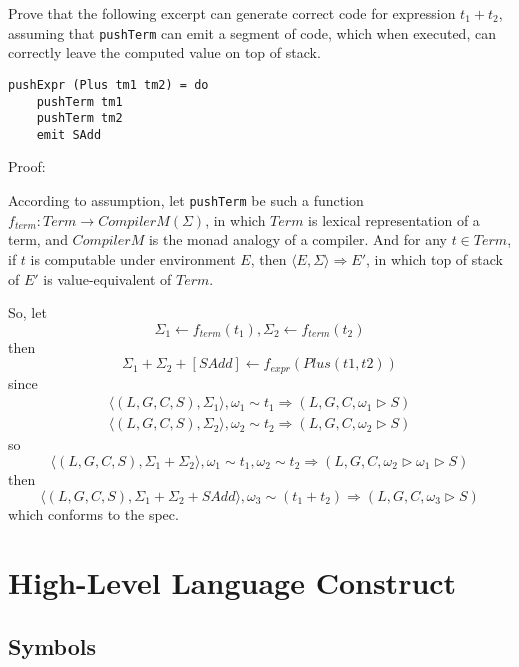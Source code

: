 \documentclass[]{article}
\numberwithin{equation}{section}
\numberwithin{figure}{section}
\numberwithin{table}{section}
\begin{document}
Prove that the following excerpt can generate correct code for expression
$t_1 + t_2$, assuming that \texttt{pushTerm} can emit a segment of code,
which when executed, can correctly leave the computed value on top of stack.

\begin{verbatim}
pushExpr (Plus tm1 tm2) = do
    pushTerm tm1
    pushTerm tm2
    emit SAdd
\end{verbatim}

Proof:

According to assumption, let \texttt{pushTerm} be such a function
$f_{term}: Term \rightarrow CompilerM(\Sigma)$, in which $Term$ is lexical
representation of a term, and $CompilerM$ is the monad analogy of a
compiler. And for any $t \in Term$, if $t$ is computable under
environment $E$, then $\langle E, \Sigma \rangle \Rightarrow E'$, in which top of stack
of $E'$ is value-equivalent of $Term$.

So, let $$\Sigma_1 \leftarrow f_{term}(t_1), \Sigma_2 \leftarrow f_{term}(t_2)$$
then $$ \Sigma_1 + \Sigma_2 + [SAdd] \leftarrow f_{expr}(Plus(t1, t2))$$
since
\begin{gather*}
  \langle (L, G, C, S), \Sigma_1\rangle, \omega_1 \sim t_1 \Rightarrow (L, G, C, \omega_1 \rhd S) \\
  \langle (L, G, C, S), \Sigma_2\rangle, \omega_2 \sim t_2 \Rightarrow (L, G, C, \omega_2 \rhd S)
\end{gather*}
so $$\langle (L, G, C, S), \Sigma_1 + \Sigma_2\rangle, \omega_1 \sim t_1, \omega_2 \sim t_2 \Rightarrow (L, G, C, \omega_2 \rhd \omega_1 \rhd S)$$
then $$\langle (L, G, C, S), \Sigma_1 + \Sigma_2 + SAdd\rangle, \omega_3 \sim (t_1 + t_2) \Rightarrow (L, G, C, \omega_3 \rhd S)$$
which conforms to the spec.

\section{High-Level Language Construct}\label{high-level-language-construct}

\subsection{Symbols}\label{symbols}
\end{document}
